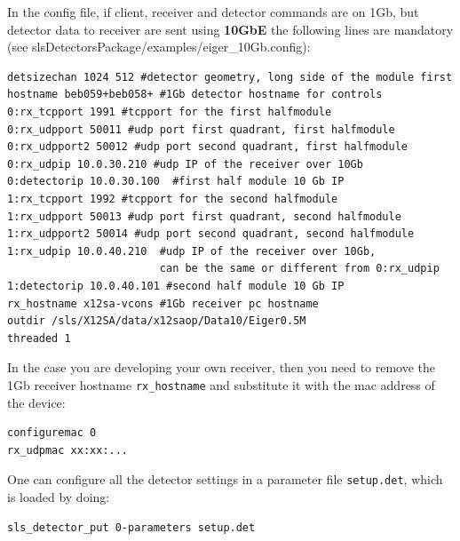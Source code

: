 \documentclass{article}
\begin{document}
In the config file, if client, receiver and detector commands are on 1Gb, but detector data to receiver are sent using \textbf{10GbE} the following lines are mandatory (see slsDetectorsPackage/examples/eiger\_10Gb.config):
\begin{verbatim}
detsizechan 1024 512 #detector geometry, long side of the module first
hostname beb059+beb058+ #1Gb detector hostname for controls
0:rx_tcpport 1991 #tcpport for the first halfmodule                 
0:rx_udpport 50011 #udp port first quadrant, first halfmodule       
0:rx_udpport2 50012 #udp port second quadrant, first halfmodule       
0:rx_udpip 10.0.30.210 #udp IP of the receiver over 10Gb              
0:detectorip 10.0.30.100  #first half module 10 Gb IP 
1:rx_tcpport 1992 #tcpport for the second halfmodule                  
1:rx_udpport 50013 #udp port first quadrant, second halfmodule     
1:rx_udpport2 50014 #udp port second quadrant, second halfmodule  
1:rx_udpip 10.0.40.210  #udp IP of the receiver over 10Gb, 
                        can be the same or different from 0:rx_udpip                                   
1:detectorip 10.0.40.101 #second half module 10 Gb IP 
rx_hostname x12sa-vcons #1Gb receiver pc hostname
outdir /sls/X12SA/data/x12saop/Data10/Eiger0.5M
threaded 1
\end{verbatim}


In the case you are developing your own receiver, then you need to remove the 1Gb receiver hostname {\tt{rx\_hostname}} and substitute it with the mac address of the device:
\begin{verbatim}
configuremac 0
rx_udpmac xx:xx:...
\end{verbatim}


One can configure all the detector settings in a parameter file {\tt{setup.det}}, which is loaded by doing:
\begin{verbatim}
sls_detector_put 0-parameters setup.det
\end{verbatim}
\end{document}
